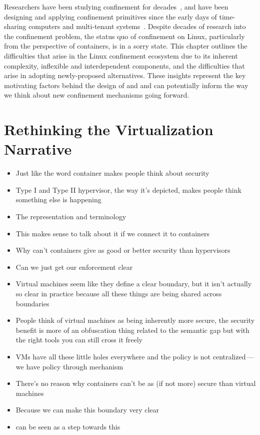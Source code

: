 Researchers have been studying confinement for decades~\cite{lampson1973_confinement}, and
have been designing and applying confinement primitives since the early days of
time-sharing computers and multi-tenant systems~\cite{shu2016_security_isolation_study}.
Despite decades of research into the confinement problem, the status quo of confinement on
Linux, particularly from the perspective of containers, is in a sorry state. This chapter
outlines the difficulties that arise in the Linux confinement ecosystem due to its
inherent complexity, inflexible and interdependent components, and the difficulties that
arise in adopting newly-proposed alternatives. These insights represent the key
motivating factors behind the design of \bpfbox{} and \bpfcontain{} and can potentially
inform the way we think about new confinement mechanisms going forward.

\section{Rethinking the Virtualization Narrative}%

\begin{inprogress}
  \begin{itemize}
    \item Just like the word container makes people think about security
    \item Type I and Type II hypervisor, the way it's depicted, makes people think something else is happening
    \item The representation and terminology
    \item This makes sense to talk about it if we connect it to containers
    \item Why can't containers give as good or better security than hypervisors
    \item Can we just get our enforcement clear
    \item Virtual machines seem like they define a clear boundary, but it isn't actually
          so clear in practice because all these things are being shared across boundaries
    \item People think of virtual machines as being inherently more secure, the security
          benefit is more of an obfuscation thing related to the semantic gap but with the right
          tools you can still cross it freely
    \item VMs have all these little holes everywhere and the policy is not centralized\,---\,we
          have policy through mechanism
    \item There's no reason why containers can't be as (if not more) secure than virtual machines
    \item Because we can make this boundary very clear
    \item \bpfcontain{} can be seen as a step towards this
  \end{itemize}
\end{inprogress}

